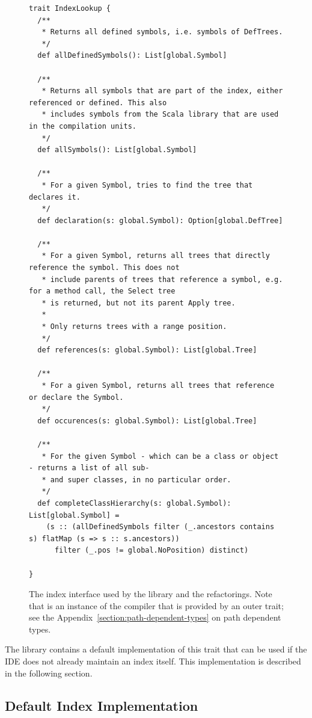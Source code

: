 \begin{figure}
\begin{lstlisting}
trait IndexLookup {
  /**
   * Returns all defined symbols, i.e. symbols of DefTrees.
   */
  def allDefinedSymbols(): List[global.Symbol]
  
  /**
   * Returns all symbols that are part of the index, either referenced or defined. This also 
   * includes symbols from the Scala library that are used in the compilation units.
   */
  def allSymbols(): List[global.Symbol]    
  
  /**
   * For a given Symbol, tries to find the tree that declares it.
   */
  def declaration(s: global.Symbol): Option[global.DefTree]

  /**
   * For a given Symbol, returns all trees that directly reference the symbol. This does not 
   * include parents of trees that reference a symbol, e.g. for a method call, the Select tree 
   * is returned, but not its parent Apply tree. 
   * 
   * Only returns trees with a range position.
   */
  def references(s: global.Symbol): List[global.Tree]
  
  /**
   * For a given Symbol, returns all trees that reference or declare the Symbol.
   */
  def occurences(s: global.Symbol): List[global.Tree]

  /**
   * For the given Symbol - which can be a class or object - returns a list of all sub- 
   * and super classes, in no particular order.
   */
  def completeClassHierarchy(s: global.Symbol): List[global.Symbol] =
    (s :: (allDefinedSymbols filter (_.ancestors contains s) flatMap (s => s :: s.ancestors)) 
      filter (_.pos != global.NoPosition) distinct)

}
\end{lstlisting}
  \caption{The index interface used by the library and the refactorings. Note that  is an instance of the compiler that is provided by an outer trait; see the Appendix~\vref{section:path-dependent-types} on path dependent types.}
  \label{listing:index-lookup}
\end{figure}

The library contains a default implementation of this trait that can be used if the IDE does not already maintain an index itself. This implementation is described in the following section.

\subsection{Default Index Implementation}

